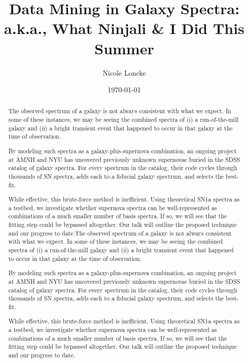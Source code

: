 \documentclass{article}
\title{Data Mining in Galaxy Spectra: \\ a.k.a., What Ninjali \& I Did This Summer}
\author{Nicole Loncke}
\date{\today}
\begin{document}
\maketitle

\tableofcontents

\begin{abstract}
The observed spectrum of a galaxy is not always consistent with what
we expect.  In some of these instances, we may be seeing the combined
spectra of (i) a run-of-the-mill galaxy and (ii) a bright transient
event that happened to occur in that galaxy at the time of
observation.

By modeling such spectra as a galaxy-plus-supernova combination, an
ongoing project at AMNH and NYU has uncovered previously unknown
supernovae buried in the SDSS catalog of galaxy spectra.  For every
spectrum in the catalog, their code cycles through thousands of SN
spectra, adds each to a fiducial galaxy spectrum, and selects the
best-fit.

While effective, this brute-force method is inefficient. Using
theoretical SN1a spectra as a testbed, we investigate whether
supernova spectra can be well-represented as combinations of a much
smaller number of basis spectra.  If so, we will see that the fitting
step could be bypassed altogether.  Our talk will outline the proposed
technique and our progress to date.The observed spectrum of a galaxy
is not always consistent with what we expect.  In some of these
instances, we may be seeing the combined spectra of (i) a
run-of-the-mill galaxy and (ii) a bright transient event that happened
to occur in that galaxy at the time of observation.

By modeling such spectra as a galaxy-plus-supernova combination, an
ongoing project at AMNH and NYU has uncovered previously unknown
supernovae buried in the SDSS catalog of galaxy spectra.  For every
spectrum in the catalog, their code cycles through thousands of SN
spectra, adds each to a fiducial galaxy spectrum, and selects the
best-fit.

While effective, this brute-force method is inefficient. Using
theoretical SN1a spectra as a testbed, we investigate whether
supernova spectra can be well-represented as combinations of a much
smaller number of basis spectra.  If so, we will see that the fitting
step could be bypassed altogether.  Our talk will outline the proposed
technique and our progress to date.
  
\end{abstract}
\end{document}
